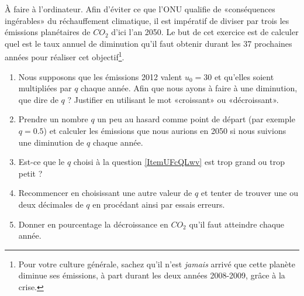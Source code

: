 
\begin{exercice}\label{exosmath-0304}

    À faire à l'ordinateur. Afin d'éviter ce que l'ONU qualifie de «conséquences ingérables» du réchauffement climatique, il est impératif de diviser par trois les émissions planétaires de \( CO_2\) d'ici l'an 2050\cite{KXZPUlP}. Le but de cet exercice est de calculer quel est le taux annuel de diminution qu'il faut obtenir durant les 37 prochaines années pour réaliser cet objectif\footnote{Pour votre culture générale, sachez qu'il n'est \emph{jamais} arrivé que cette planète diminue ses émissions, à part durant les deux années 2008-2009, grâce à la crise.}.

    \begin{enumerate}
        \item
            Nous supposons que les émissions 2012 valent \( u_0=\)\unit{30}{\giga\ton}\cite{XZZqclR} et qu'elles soient multipliées par \( q\) chaque année. Afin que nous ayons à faire à une diminution, que dire de \( q\) ? Justifier en utilisant le mot «croissant» ou «décroissant».
        \item   \label{ItemUFcQLwv}
            Prendre un nombre \( q\) un peu au hasard comme point de départ (par exemple \( q=0.5\)) et calculer les émissions que nous aurions en 2050 si nous suivions une diminution de \( q\) chaque année.
        \item
            Est-ce que le \( q\) choisi à la question \ref{ItemUFcQLwv} est trop grand ou trop petit ?
        \item
            Recommencer en choisissant une autre valeur de \( q\) et tenter de trouver une ou deux décimales de \( q\) en procédant ainsi par essais erreurs.
        \item
            Donner en pourcentage la décroissance en \( CO_2\) qu'il faut atteindre chaque année.
    \end{enumerate}

\end{exercice}
